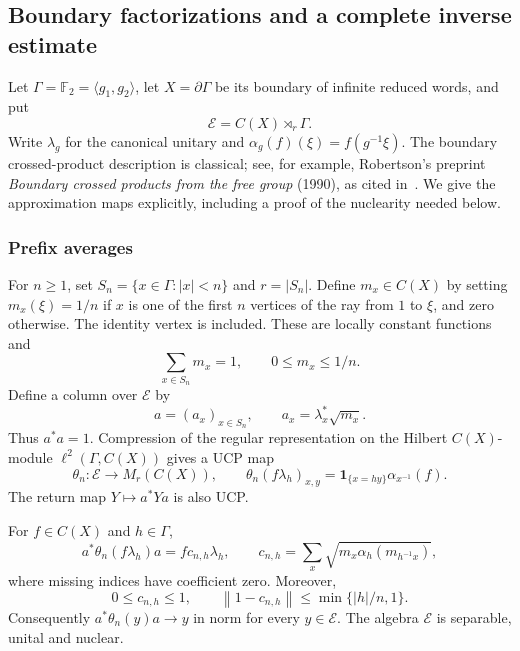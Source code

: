\subsection{Boundary factorizations and a complete inverse estimate}

\label{sec:cu-boundary}

Let $\Gamma=\mathbb{F}_2=\langle g_1,g_2\rangle$, let $X=\partial\Gamma$ be
its boundary of infinite reduced words, and put 
\begin{equation*}
\mathcal{E}=C(X)\rtimes_r\Gamma.
\end{equation*}
Write $\lambda_g$ for the canonical unitary and $\alpha_g(f)(\xi)=f(g^{-1}\xi)$. The boundary crossed-product description is classical; see, for
example, Robertson's preprint \emph{Boundary crossed products from the free group} (1990), as cited in~\cite{LupiniCuntz2026}. We give the approximation maps explicitly,
including a proof of the nuclearity needed below.


\subsubsection{Prefix averages}

For $n\geq1$, set $S_n=\{x\in\Gamma:|x|<n\}$ and $r=|S_n|$. Define $m_x\in
C(X)$ by setting $m_x(\xi)=1/n$ if $x$ is one of the first $n$ vertices of
the ray from $1$ to $\xi$, and zero otherwise. The identity vertex is
included. These are locally constant functions and 
\begin{equation}  \label{eq:cu-prefix}
\sum_{x\in S_n}m_x=1,\qquad 0\leq m_x\leq 1/n.
\end{equation}
Define a column over $\mathcal{E}$ by 
\begin{equation*}
a=(a_x)_{x\in S_n},\qquad a_x=\lambda_x^*\sqrt{m_x}.
\end{equation*}
Thus $a^*a=1$. Compression of the regular representation on the Hilbert $C(X) $-module $\ell^2(\Gamma,C(X))$ gives a UCP map 
\begin{equation*}
\theta_n:\mathcal{E}\longrightarrow M_r(C(X)),\qquad
\theta_n(f\lambda_h)_{x,y} =\mathbf{1}_{\{x=hy\}}\alpha_{x^{-1}}(f).
\end{equation*}
The return map $Y\mapsto a^*Ya$ is also UCP.

\begin{lemma}\label{lem:cu-boundary-recovery}
 For $f\in C(X)$ and $h\in\Gamma$, 
\begin{equation*}
a^*\theta_n(f\lambda_h)a=fc_{n,h}\lambda_h,\qquad c_{n,h}=\sum_x\sqrt{m_x\alpha_h(m_{h^{-1}x})},
\end{equation*}
where missing indices have coefficient zero. Moreover, 
\begin{equation*}
0\leq c_{n,h}\leq1,\qquad \left\|1-c_{n,h}\right\|\leq\min\{|h|/n,1\}.
\end{equation*}
Consequently $a^*\theta_n(y)a\to y$ in norm for every $y\in\mathcal{E}$. The
algebra $\mathcal{E}$ is separable, unital and nuclear.
\end{lemma}

